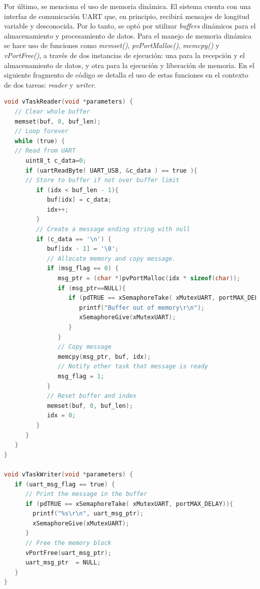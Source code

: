Por último, se menciona el uso de memoria dinámica. El sistema cuenta con una interfaz de comunicación UART que, en principio, recibirá mensajes de longitud variable y desconocida. Por lo tanto, se optó por utilizar \textit{buffers} dinámicos para el almacenamiento y procesamiento de datos. Para el manejo de memoria dinámica se hace uso de funciones como \textit{memset()}, \textit{pvPortMalloc()}, \textit{memcpy()} y \textit{vPortFree()}, a través de dos instancias de ejecución: una para la recepción y el almacenamiento de datos, y otra para la ejecución y liberación de memoria. En el siguiente fragmento de código se detalla el uso de estas funciones en el contexto de dos tareas: \textit{reader} y \textit{writer}.


\begin{lstlisting}[caption=Ejemplo de memoria dinámica con dos tareas reader y writer.,
	language=C, 
	backgroundcolor=\color{mygray},
	]
void vTaskReader(void *parameters) {
   // Clear whole buffer
   memset(buf, 0, buf_len);
   // Loop forever
   while (true) {
   // Read from UART
      uint8_t c_data=0;
      if (uartReadByte( UART_USB, &c_data ) == true ){
      // Store to buffer if not over buffer limit  
         if (idx < buf_len - 1){
            buf[idx] = c_data;
            idx++;
         }
         // Create a message ending string with null
         if (c_data == '\n') {
            buf[idx - 1] = '\0';
            // Allocate memory and copy message. 
            if (msg_flag == 0) {
               msg_ptr = (char *)pvPortMalloc(idx * sizeof(char));
               if (msg_ptr==NULL){
                  if (pdTRUE == xSemaphoreTake( xMutexUART, portMAX_DELAY)){
                     printf("Buffer out of memory\r\n");
                     xSemaphoreGive(xMutexUART);
                  }
               }
               // Copy message
               memcpy(msg_ptr, buf, idx);
               // Notify other task that message is ready
               msg_flag = 1;
            }
            // Reset buffer and index
            memset(buf, 0, buf_len);
            idx = 0;
         }
      }
   }
}     

void vTaskWriter(void *parameters) {
   if (uart_msg_flag == true) {
      // Print the message in the buffer 
      if (pdTRUE == xSemaphoreTake( xMutexUART, portMAX_DELAY)){
        printf("%s\r\n", uart_msg_ptr);
        xSemaphoreGive(xMutexUART);
      }
      // Free the memory block  
      vPortFree(uart_msg_ptr);  
      uart_msg_ptr  = NULL;
   }
}

\end{lstlisting}

